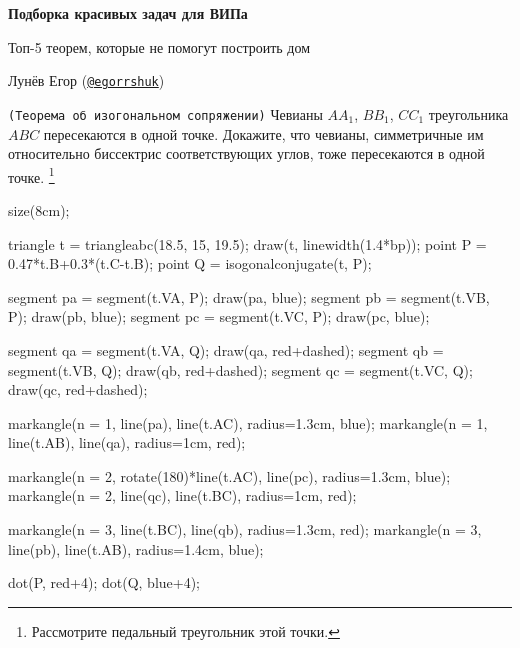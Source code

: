 \documentclass[12pt, twoside]{article}
\newcommand{\task}[2]{\texttt{(#1)} #2}
\begin{document}
	
	\begin{center}
		
		\Large
		\textbf{Подборка красивых задач для ВИПа}
		\large
		\vspace{5mm}
		
		Топ-5 теорем, которые не помогут построить дом
		
		\vspace{5mm}
		
		Лунёв Егор (\href{https://t.me/egorrshuk}{\texttt{@egorrshuk}})
		
		\vspace{5mm}
	\end{center}
	
	\begin{multicols}{2}
		\begin{tasks}
			\item \task{Теорема об изогональном сопряжении}{Чевианы $AA_1$, $BB_1$, $CC_1$ треугольника $ABC$ пересекаются в одной точке. Докажите, что чевианы, симметричные им относительно биссектрис соответствующих углов, тоже пересекаются в одной точке. \footnote{Рассмотрите педальный треугольник этой точки.}}
			
			\begin{center}
				\begin{asy}
				size(8cm);
				
				triangle t = triangleabc(18.5, 15, 19.5);
				draw(t, linewidth(1.4*bp));
				point P = 0.47*t.B+0.3*(t.C-t.B); 
				point Q = isogonalconjugate(t, P);
				
				segment pa = segment(t.VA, P); draw(pa, blue);
				segment pb = segment(t.VB, P); draw(pb, blue); 
				segment pc = segment(t.VC, P); draw(pc, blue);
				
				segment qa = segment(t.VA, Q); draw(qa, red+dashed);
				segment qb = segment(t.VB, Q); draw(qb, red+dashed); 
				segment qc = segment(t.VC, Q); draw(qc, red+dashed);
				
				markangle(n = 1, line(pa), line(t.AC), radius=1.3cm, blue);
				markangle(n = 1, line(t.AB), line(qa), radius=1cm, red);
				
				markangle(n = 2, rotate(180)*line(t.AC), line(pc), radius=1.3cm, blue);
				markangle(n = 2, line(qc), line(t.BC), radius=1cm, red);
				
				markangle(n = 3, line(t.BC), line(qb), radius=1.3cm, red);
				markangle(n = 3, line(pb), line(t.AB), radius=1.4cm, blue);
				
				dot(P, red+4);
				dot(Q, blue+4);
				\end{asy}
			\end{center}
			

\end{tasks}
\end{multicols}
\end{document}
